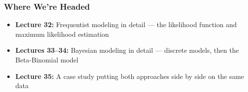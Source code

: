 \documentclass[slidestop,compress,mathserif]{beamer}
\begin{document}
\begin{frame}
    \frametitle{Where We're Headed}
    \begin{itemize}
        \item \textbf{Lecture 32:} Frequentist modeling in detail --- the likelihood function and maximum likelihood estimation
        \item \textbf{Lectures 33--34:} Bayesian modeling in detail --- discrete models, then the Beta-Binomial model
        \item \textbf{Lecture 35:} A case study putting both approaches side by side on the same data
    \end{itemize}
\end{frame}

\end{document}
